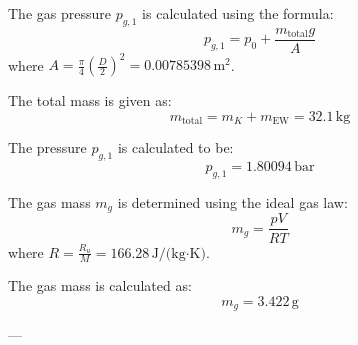 The gas pressure \( p_{g,1} \) is calculated using the formula:  
\[
p_{g,1} = p_0 + \frac{m_{\text{total}} g}{A}
\]  
where \( A = \frac{\pi}{4} \left( \frac{D}{2} \right)^2 = 0.00785398 \, \text{m}^2 \).  

The total mass is given as:  
\[
m_{\text{total}} = m_K + m_{\text{EW}} = 32.1 \, \text{kg}
\]  

The pressure \( p_{g,1} \) is calculated to be:  
\[
p_{g,1} = 1.80094 \, \text{bar}
\]  

The gas mass \( m_g \) is determined using the ideal gas law:  
\[
m_g = \frac{p V}{R T}
\]  
where \( R = \frac{R_u}{M} = 166.28 \, \text{J/(kg·K)} \).  

The gas mass is calculated as:  
\[
m_g = 3.422 \, \text{g}
\]  

---